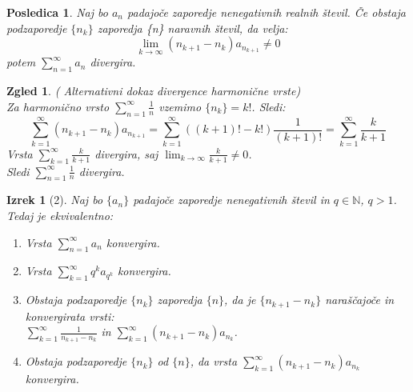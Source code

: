 \documentclass{beamer}
\newtheorem{izrek}{Izrek}
\newtheorem{posledica}{Posledica}
\newtheorem{zgled}{Zgled}
\begin{document}
\begin{frame}
    \begin{posledica}
        Naj bo ${a_n}$ padajoče zaporedje nenegativnih realnih števil.
        Če obstaja podzaporedje $\{n_k\}$ zaporedja \{n\} naravnih števil, da velja:
        \[
            \lim_{k \to \infty} (n_{k+1} - n_k)a_{n_{k+1}} \neq 0 
        \] 
        potem $\sum_{n = 1}^{\infty}{a_n}$ divergira.
    \end{posledica}
\end{frame}



\begin{frame}
    \begin{zgled}
        ( Alternativni dokaz divergence harmonične vrste)\\
        Za harmonično vrsto $\sum_{n = 1}^{\infty}{\frac{1}{n}}$ vzemimo $\{n_k\} = k!$. Sledi:
        \pause
        \[
            \sum_{k = 1}^{\infty}{(n_{k+1} - n_k)a_{n_{k + 1}}} =
            \sum_{k = 1}^{\infty}{((k + 1)! - k!) \frac{1}{(k+1)!}}=
            \sum_{k = 1}^{\infty}{\frac{k}{k + 1}}
        \]
        \pause
        Vrsta $\sum_{k = 1}^{\infty}{\frac{k}{k + 1}}$ divergira,
        saj $\lim_{k \to \infty}{\frac{k}{k + 1}} \neq 0$. \\
        \vspace{0.3 cm}
        Sledi $\sum_{n = 1}^{\infty}{\frac{1}{n}}$ divergira.
    \end{zgled}
\end{frame}


\begin{frame}
    \begin{izrek}[2]
        Naj bo $\{a_n\}$ padajoče zaporedje nenegativnih števil in $ q \in {\mathbb{N}}$, $q > 1$. Tedaj je ekvivalentno:
        \begin{enumerate}
            \item Vrsta $\sum_{n = 1}^{\infty}{a_n}$ konvergira.
            \pause
            \item Vrsta $\sum_{k = 1}^{\infty}{q^ka_{q^k}}$ konvergira.
            \pause
            \item Obstaja podzaporedje $\{n_k\}$ zaporedja $\{n\}$, da je $\{n_{k+1} - n_k\}$ 
            naraščajoče in konvergirata vrsti:\\
            $\sum_{k = 1}^{\infty}{\frac{1}{n_{k+1} - n_k}}$ in 
            $\sum_{k = 1}^{\infty}{(n_{k+1} - n_k)a_{n_k}}$. 
            \pause
            \item Obstaja podzaporedje $\{n_k\}$ od $\{n\}$, da vrsta $\sum_{k = 1}^{\infty}{(n_{k+1} - n_k)a_{n_k}}$ konvergira.
        \end{enumerate}
    \end{izrek}    
\end{frame}
\end{document}
